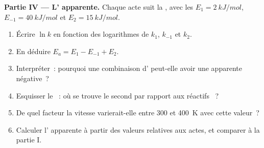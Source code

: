 \begin{problem}
\medskip
\noindent\textbf{Partie IV --- L' apparente.}
Chaque acte suit la , avec les 
$E_1 =
\qty{2}{kJ/mol}$, $E_{-1} = \qty{40}{kJ/mol}$ et $E_2 =
\qty{15}{kJ/mol}$.
\begin{enumerate}[resume]
  \item Écrire $\ln k$ en fonction des logarithmes de $k_1$, $k_{-1}$ et
        $k_2$.
  \item En déduire $E_a = E_1 - E_{-1} + E_2$.
  \item Interpréter~: pourquoi une combinaison d'
        peut-elle avoir une  apparente négative~?
  \item Esquisser le ~: où se trouve le second  par rapport aux réactifs ~?
  \item De quel facteur la vitesse varierait-elle entre 300 et
        \qty{400}{K} avec cette valeur~?
  \item Calculer l' apparente à partir des valeurs
        relatives aux actes, et comparer à la partie I.
\end{enumerate}
\end{problem}
